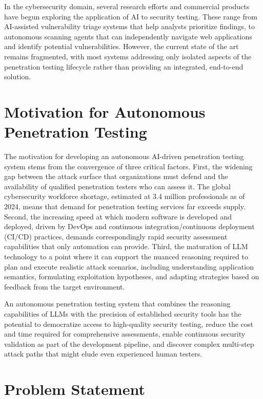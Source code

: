 In the cybersecurity domain, several research efforts and commercial products have begun exploring the application of AI to security testing. These range from AI-assisted vulnerability triage systems that help analysts prioritize findings, to autonomous scanning agents that can independently navigate web applications and identify potential vulnerabilities. However, the current state of the art remains fragmented, with most systems addressing only isolated aspects of the penetration testing lifecycle rather than providing an integrated, end-to-end solution.

\section{Motivation for Autonomous Penetration Testing}
\label{sec:motivation}

The motivation for developing an autonomous AI-driven penetration testing system stems from the convergence of three critical factors. First, the widening gap between the attack surface that organizations must defend and the availability of qualified penetration testers who can assess it. The global cybersecurity workforce shortage, estimated at 3.4 million professionals as of 2024, means that demand for penetration testing services far exceeds supply. Second, the increasing speed at which modern software is developed and deployed, driven by DevOps and continuous integration/continuous deployment (CI/CD) practices, demands correspondingly rapid security assessment capabilities that only automation can provide. Third, the maturation of LLM technology to a point where it can support the nuanced reasoning required to plan and execute realistic attack scenarios, including understanding application semantics, formulating exploitation hypotheses, and adapting strategies based on feedback from the target environment.

An autonomous penetration testing system that combines the reasoning capabilities of LLMs with the precision of established security tools has the potential to democratize access to high-quality security testing, reduce the cost and time required for comprehensive assessments, enable continuous security validation as part of the development pipeline, and discover complex multi-step attack paths that might elude even experienced human testers.

\section{Problem Statement}
\label{sec:problem-statement}

